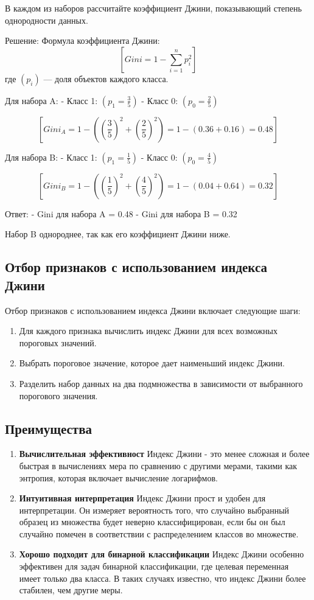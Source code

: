 \documentclass{article}
\begin{document}
\begin{itemize}
В каждом из наборов рассчитайте коэффициент Джини, показывающий степень однородности данных.  

Решение:  
Формула коэффициента Джини:  
$$[
Gini = 1 - \sum_{i=1}^{n} p_i^2
]  $$
где $(p_i)$ — доля объектов каждого класса.

Для набора A:  
- Класс 1: $(p_1 = \frac{3}{5})$  
- Класс 0: $(p_0 = \frac{2}{5})$

$$[
Gini_A = 1 - \left(\left(\frac{3}{5}\right)^2 + \left(\frac{2}{5}\right)^2\right) = 1 - \left(0.36 + 0.16\right) = 0.48
]$$

Для набора B:  
- Класс 1: $(p_1 = \frac{1}{5}) $
- Класс 0: $(p_0 = \frac{4}{5}) $

$$[
Gini_B = 1 - \left(\left(\frac{1}{5}\right)^2 + \left(\frac{4}{5}\right)^2\right) = 1 - \left(0.04 + 0.64\right) = 0.32
]$$

Ответ:  
- Gini для набора A = 0.48  
- Gini для набора B = 0.32  

Набор B однороднее, так как его коэффициент Джини ниже.

\end{itemize}

\subsection*{Отбор признаков с использованием индекса Джини}

Отбор признаков с использованием индекса Джини включает следующие шаги:

\begin{enumerate}
    \item Для каждого признака вычислить индекс Джини для всех возможных пороговых значений.
    \item Выбрать пороговое значение, которое дает наименьший индекс Джини.
    \item Разделить набор данных на два подмножества в зависимости от выбранного порогового значения.
\end{enumerate}


\subsection*{Преимущества}

\begin{enumerate}
    \item {\bf Вычислительная эффективност} Индекс Джини - это менее сложная и более быстрая в вычислениях мера по сравнению с другими мерами, такими как энтропия, которая включает вычисление логарифмов.
    \item {\bf Интуитивная интерпретация} Индекс Джини прост и удобен для интерпретации. Он измеряет вероятность того, что случайно выбранный образец из множества будет неверно классифицирован, если бы он был случайно помечен в соответствии с распределением классов во множестве.
    \item {\bf Хорошо подходит для бинарной классификации} Индекс Джини особенно эффективен для задач бинарной классификации, где целевая переменная имеет только два класса. В таких случаях известно, что индекс Джини более стабилен, чем другие меры.
\end{enumerate}
\end{document}
